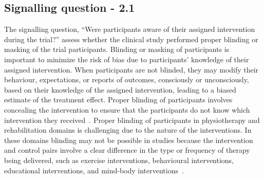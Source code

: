 \documentclass[sn-mathphys,Numbered]{sn-jnl}%
\begin{document}
\subsection*{Signalling question - 2.1}
\label{subsec:2_1}
%
The signalling question, ``Were participants aware of their assigned intervention during the trial?'' assess whether the clinical study performed proper blinding or masking of the trial participants.
Blinding or masking of participants is important to minimize the risk of bias due to participants' knowledge of their assigned intervention.
When participants are not blinded, they may modify their behaviour, expectations, or reports of outcomes, consciously or unconsciously, based on their knowledge of the assigned intervention, leading to a biased estimate of the treatment effect.
Proper blinding of participants involves concealing the intervention to ensure that the participants do not know which intervention they received~\cite{cedenilla2023psychosocial,swan2003bupropion,o2012rethinking}.
Proper blinding of participants in physiotherapy and rehabilitation domains is challenging due to the nature of the interventions. 
In these domains blinding may not be possible in studies because the intervention and control pairs involve a clear difference in the type or frequency of therapy being delivered, such as exercise interventions, behavioural interventions, educational interventions, and mind-body interventions~\cite{andersson2020effect,buttery2023lung}.
\end{document}
